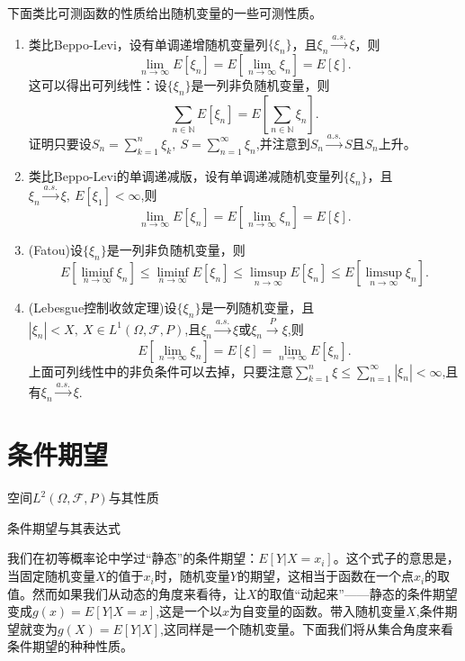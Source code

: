\documentclass[lang=cn,10pt]{elegantbook}
\begin{document}
	下面类比可测函数的性质给出随机变量的一些可测性质。
	\begin{property}
		\begin{enumerate}
			\item 类比Beppo-Levi，设有单调递增随机变量列\(\{\xi_n\}\)，且\(\xi_n\xrightarrow{a.s.}\xi\)，则
			\[\lim_{n \to \infty}E[\xi_n]=E[\lim_{n \to \infty}\xi_n]=E[\xi].\]这可以得出可列线性：设\(\{\xi_n\}\)是一列非负随机变量，则
			\[\sum_{n\in \mathbb{N}}E[\xi_n]=E[\sum_{n\in \mathbb{N}}\xi_n].\]证明只要设\(S_n=\sum_{k=1}^{n}\xi_k,\ S=\sum_{n=1}^{\infty}\xi_n\),并注意到\(S_n\xrightarrow{a.s.}S\)且\(S_n\)上升。
			\item 类比Beppo-Levi的单调递减版，设有单调递减随机变量列\(\{\xi_n\}\)，且\(\xi_n\xrightarrow{a.s.}\xi,\ E[\xi_1]<\infty\),则
			\[\lim_{n \to \infty}E[\xi_n]=E[\lim_{n \to \infty}\xi_n]=E[\xi].\]
			\item (Fatou)设\(\{\xi_n\}\)是一列非负随机变量，则
			\[E[\liminf_{n \to \infty}\xi_n]\le \liminf_{n \to \infty}E[\xi_n]\le \limsup_{n\to \infty}E[\xi_n]\le E[\limsup_{n\to \infty}\xi_n].\]
			\item (Lebesgue控制收敛定理)设\(\{\xi_n\}\)是一列随机变量，且\(|\xi_n|<X,\ X\in L^1(\Omega,\mathcal{F},P)\),且\(\xi_n\xrightarrow{a.s.}\xi\)或\(\xi_n\xrightarrow{P}\xi\),则
			\[E[\lim_{n \to \infty}\xi_n]=E[\xi]=\lim_{n \to \infty}E[\xi_n].\]
			上面可列线性中的非负条件可以去掉，只要注意\(\sum_{k=1}^{n}\xi\le \sum_{n=1}^{\infty}|\xi_n|<\infty\),且有\(\xi_n\xrightarrow{a.s.}\xi\).
		\end{enumerate}
	\end{property}
	
	\chapter{条件期望}
	\begin{introduction}
		\item 空间\(L^2(\Omega,\mathcal{F},P)\)与其性质
		\item 条件期望与其表达式
	\end{introduction}
	我们在初等概率论中学过“静态”的条件期望：\(E[Y|X=x_i]\)。这个式子的意思是，当固定随机变量\(X\)的值于\(x_i\)时，随机变量\(Y\)的期望，这相当于函数在一个点\(x_i\)的取值。然而如果我们从动态的角度来看待，让\(X\)的取值“动起来”——静态的条件期望变成\(g(x)=E[Y|X=x]\),这是一个以\(x\)为自变量的函数。带入随机变量\(X\),条件期望就变为\(g(X)=E[Y|X]\),这同样是一个随机变量。下面我们将从集合角度来看条件期望的种种性质。
\end{document}
